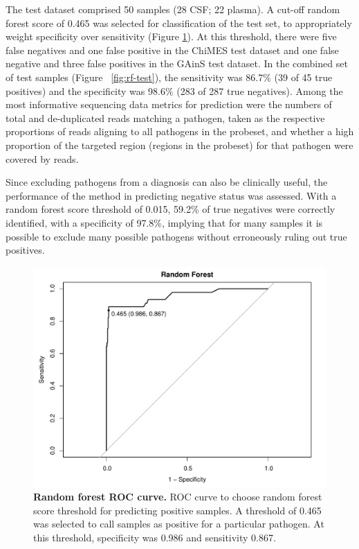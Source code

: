 The test dataset comprised 50 samples (28 CSF; 22 plasma). A cut-off random forest score of 0.465 was selected for classification of the test set, to appropriately weight specificity over sensitivity (Figure \ref{fig:rf-roc}). At this threshold, there were five false negatives and one false positive in the ChiMES test dataset and one false negative and three false positives in the GAinS test dataset. In the combined set of test samples (Figure ~\ref{fig:rf-test}), the sensitivity was 86.7\% (39 of 45 true positives) and the specificity was 98.6\% (283 of 287 true negatives). Among the most informative sequencing data metrics for prediction were the numbers of total and de-duplicated reads matching a pathogen, taken as the respective proportions of reads aligning to all pathogens in the probeset, and whether a high proportion of the targeted region (regions in the probeset) for that pathogen were covered by reads. 

Since excluding pathogens from a diagnosis can also be clinically useful, the performance of the method in predicting negative status was assessed. With a random forest score threshold of 0.015, 59.2\% of true negatives were correctly identified, with a specificity of 97.8\%, implying that for many samples it is possible to exclude many possible pathogens without erroneously ruling out true positives.

\FloatBarrier
\begin{figure}[htbp]
\centering
\includegraphics[scale=0.6]{./Results2/Images/rf-roc.pdf}
\caption[Random forest ROC curve]{\textbf{Random forest ROC curve.} ROC curve to choose random forest score threshold for predicting positive samples. A threshold of 0.465 was selected to call samples as positive for a particular pathogen. At this threshold, specificity was 0.986 and sensitivity 0.867.}
\label{fig:rf-roc}
\end{figure}

